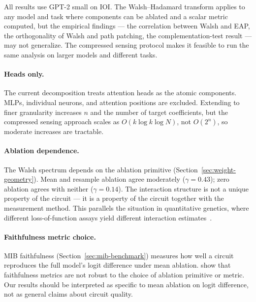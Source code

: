 \documentclass{article}
\begin{document}
All results use GPT-2 small on IOI. The Walsh--Hadamard transform
applies to any model and task where components can be ablated and a
scalar metric computed, but the empirical findings --- the correlation
between Walsh and EAP, the orthogonality of Walsh and path patching,
the complementation-test result --- may not generalize. The compressed
sensing protocol makes it feasible to run the same analysis on larger
models and different tasks.

\paragraph{Heads only.}

The current decomposition treats attention heads as the atomic
components. MLPs, individual neurons, and attention positions are
excluded. Extending to finer granularity increases $n$ and the number
of target coefficients, but the compressed sensing approach scales
as $O(k \log k \log N)$, not $O(2^n)$, so moderate increases are
tractable.

\paragraph{Ablation dependence.}

The Walsh spectrum depends on the ablation primitive
(Section~\ref{sec:weight-geometry}). Mean and resample ablation agree
moderately ($\gamma = 0.43$); zero ablation agrees with neither
($\gamma = 0.14$). The interaction structure is not a unique property
of the circuit --- it is a property of the circuit together with the
measurement method. This parallels the situation in quantitative
genetics, where different loss-of-function assays yield different
interaction
estimates~\citep{housden2017comparison,fluidity2024elife}.

\paragraph{Faithfulness metric choice.}

MIB faithfulness (Section~\ref{sec:mib-benchmark}) measures how well a
circuit reproduces the full model's logit difference under mean ablation.
\citet{miller2024transformer} show that faithfulness metrics are not
robust to the choice of ablation primitive or metric. Our results should
be interpreted as specific to mean ablation on logit difference, not as
general claims about circuit quality.


\end{document}
